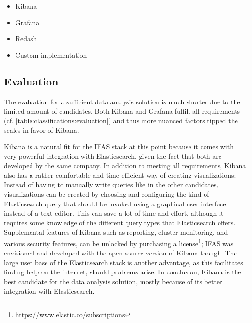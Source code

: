 \begin{itemize}[noitemsep]
\item Kibana
\item Grafana
\item Redash
\item Custom implementation
\end{itemize}

\subsection{Evaluation}

The evaluation for a sufficient data analysis solution is much shorter due to the limited amount of candidates.
Both Kibana and Grafana fulfill all requirements (cf. \cref{table:classifications:evaluation}) and thus more nuanced factors tipped the scales in favor of Kibana.

\begin{table}[t]
\centering
\caption[Classification of data analysis solutions.]{
Classification of data analysis solutions.
As all solutions meet all requirements, more nuanced differences decide about the ideal candidate.}
\label{table:classifications:evaluation}
\end{table}

Kibana is a natural fit for the \ac{IFAS} stack at this point because it comes with very powerful integration with Elasticsearch, given the fact that both are developed by the same company.
In addition to meeting all requirements, Kibana also has a rather comfortable and time-efficient way of creating visualizations:
Instead of having to manually write queries like in the other candidates, visualizations can be created by choosing and configuring the kind of Elasticsearch query that should be invoked using a graphical user interface instead of a text editor.
This can save a lot of time and effort, although it requires some knowledge of the different query types that Elasticsearch offers.
Supplemental features of Kibana such as reporting, cluster monitoring, and various security features, can be unlocked by purchasing a license\footnote{\url{https://www.elastic.co/subscriptions}}; \ac{IFAS} was envisioned and developed with the open source version of Kibana though.
The large user base of the Elasticsearch stack is another advantage, as this facilitates finding help on the internet, should problems arise.
In conclusion, Kibana is the best candidate for the data analysis solution, mostly because of its better integration with Elasticsearch.


